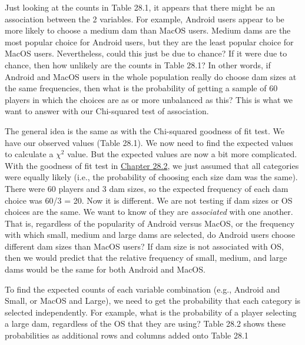 \documentclass[
]{scrbook}
\begin{document}
Just looking at the counts in Table 28.1, it appears that there might be an association between the 2 variables.
For example, Android users appear to be more likely to choose a medium dam than MacOS users.
Medium dams are the most popular choice for Android users, but they are the least popular choice for MacOS users.
Nevertheless, could this just be due to chance?
If it were due to chance, then how unlikely are the counts in Table 28.1?
In other words, if Android and MacOS users in the whole population really do choose dam sizes at the same frequencies, then what is the probability of getting a sample of 60 players in which the choices are as or more unbalanced as this?
This is what we want to answer with our Chi-squared test of association.

The general idea is the same as with the Chi-squared goodness of fit test.
We have our observed values (Table 28.1).
We now need to find the expected values to calculate a \(\chi^{2}\) value.
But the expected values are now a bit more complicated.
With the goodness of fit test in \protect\hyperlink{chi-squared-goodness-of-fit}{Chapter 28.2}, we just assumed that all categories were equally likely (i.e., the probability of choosing each size dam was the same).
There were 60 players and 3 dam sizes, so the expected frequency of each dam choice was 60/3 = 20.
Now it is different.
We are not testing if dam sizes or OS choices are the same.
We want to know of they are \emph{associated} with one another.
That is, regardless of the popularity of Android versus MacOS, or the frequency with which small, medium and large dams are selected, do Android users choose different dam sizes than MacOS users?
If dam size is not associated with OS, then we would predict that the relative frequency of small, medium, and large dams would be the same for both Android and MacOS.

To find the expected counts of each variable combination (e.g., Android and Small, or MacOS and Large), we need to get the probability that each category is selected independently.
For example, what is the probability of a player selecting a large dam, regardless of the OS that they are using?
Table 28.2 shows these probabilities as additional rows and columns added onto Table 28.1
\end{document}
